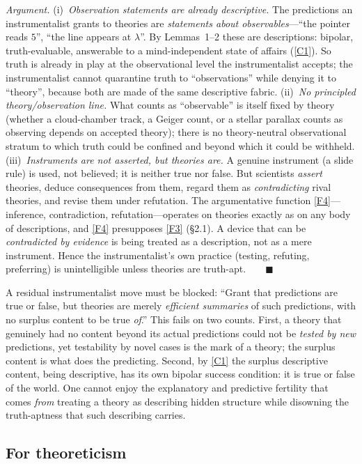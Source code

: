 \documentclass[12pt]{article}
\begin{document}
\noindent\emph{Argument.} (i)~\emph{Observation statements are already
descriptive.} The predictions an instrumentalist grants to theories are
\emph{statements about observables}---``the pointer reads $5$'', ``the
line appears at $\lambda$''. By Lemmas~1--2 these are descriptions:
bipolar, truth-evaluable, answerable to a mind-independent state of
affairs (\ref{C1}). So truth is already in play at the observational
level the instrumentalist accepts; the instrumentalist cannot quarantine
truth to ``observations'' while denying it to ``theory'', because both are
made of the same descriptive fabric. (ii)~\emph{No principled
theory/observation line.} What counts as ``observable'' is itself fixed by
theory (whether a cloud-chamber track, a Geiger count, or a stellar
parallax counts as observing depends on accepted theory); there is no
theory-neutral observational stratum to which truth could be confined and
beyond which it could be withheld. (iii)~\emph{Instruments are not
asserted, but theories are.} A genuine instrument (a slide rule) is used,
not believed; it is neither true nor false. But scientists \emph{assert}
theories, deduce consequences from them, regard them as
\emph{contradicting} rival theories, and revise them under refutation. The
argumentative function \ref{F4}---inference, contradiction,
refutation---operates on theories exactly as on any body of descriptions,
and \ref{F4} presupposes \ref{F3} (\S2.1). A device that can be
\emph{contradicted by evidence} is being treated as a description, not as
a mere instrument. Hence the instrumentalist's own practice (testing,
refuting, preferring) is unintelligible unless theories are
truth-apt.$\qquad\blacksquare$

A residual instrumentalist move must be blocked: ``Grant that predictions
are true or false, but theories are merely \emph{efficient summaries} of
such predictions, with no surplus content to be true \emph{of}.'' This
fails on two counts. First, a theory that genuinely had no content beyond
its actual predictions could not be \emph{tested by new} predictions, yet
testability by novel cases is the mark of a theory; the surplus content is
what does the predicting. Second, by \ref{C1} the surplus descriptive
content, being descriptive, has its own bipolar success condition: it is
true or false of the world. One cannot enjoy the explanatory and
predictive fertility that comes \emph{from} treating a theory as
describing hidden structure while disowning the truth-aptness that such
describing carries.

\subsection{For theoreticism}
\end{document}

